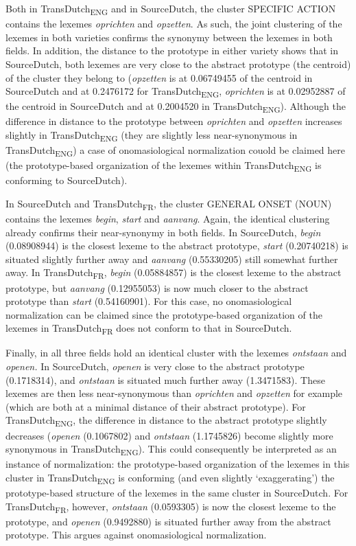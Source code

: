 Both in TransDutch\textsubscript{ENG} and in SourceDutch, the cluster {SPECIFIC} ACTION contains the lexemes \textit{oprichten} and \textit{opzetten}. As such, the joint clustering of the lexemes in both varieties confirms the synonymy between the lexemes in both fields. In addition, the distance to the prototype in either variety shows that in SourceDutch, both lexemes are very close to the abstract prototype (the centroid) of the cluster they belong to (\textit{opzetten} is at 0.06749455 of the centroid in SourceDutch and at 0.2476172 for TransDutch\textsubscript{ENG}, \textit{oprichten} is at 0.02952887 of the centroid in SourceDutch and at 0.2004520 in TransDutch\textsubscript{ENG}). Although the difference in distance to the prototype between \textit{oprichten} and \textit{opzetten} increases slightly in TransDutch\textsubscript{ENG} (they are slightly less near-synonymous in TransDutch\textsubscript{ENG})\textsubscript{} a case of onomasiological normalization couold be claimed here (the prototype-based organization of the lexemes within TransDutch\textsubscript{ENG} is conforming to SourceDutch).

In SourceDutch and TransDutch\textsubscript{FR}, the cluster GENERAL ONSET (NOUN) contains the lexemes \textit{begin}, \textit{start} and \textit{aanvang}. Again, the identical clustering already confirms their near-synonymy in both fields. In SourceDutch, \textit{begin} (0.08908944) is the closest lexeme to the abstract prototype, \textit{start} (0.20740218) is situated slightly further away and \textit{aanvang} (0.55330205) still somewhat further away. In TransDutch\textsubscript{FR}, \textit{begin} (0.05884857) is the closest lexeme to the abstract prototype, but \textit{aanvang} (0.12955053) is now much closer to the abstract prototype than \textit{start} (0.54160901). For this case, no onomasiological normalization can be claimed since the prototype-based organization of the lexemes in TransDutch\textsubscript{FR} does not conform to that in SourceDutch.

Finally, in all three fields hold an identical cluster with the lexemes \textit{ontstaan} and \textit{openen.} In SourceDutch, \textit{openen} is very close to the abstract prototype (0.1718314), and \textit{ontstaan} is situated much further away (1.3471583). These lexemes are then less near-synonymous than \textit{oprichten} and \textit{opzetten} for example (which are both at a minimal distance of their abstract prototype). For TransDutch\textsubscript{ENG}, the difference in distance to the abstract prototype slightly decreases (\textit{openen} (0.1067802) and \textit{ontstaan} (1.1745826) become slightly more synonymous in TransDutch\textsubscript{ENG}). This could consequently be interpreted as an instance of normalization: the prototype-based organization of the lexemes in this cluster in TransDutch\textsubscript{ENG} is conforming (and even slightly ‘exaggerating’) the prototype-based structure of the lexemes in the same cluster in SourceDutch. For TransDutch\textsubscript{FR}, however, \textit{ontstaan} (0.0593305) is now the closest lexeme to the prototype, and \textit{openen} (0.9492880) is situated further away from the abstract prototype. This argues against onomasiological normalization.

